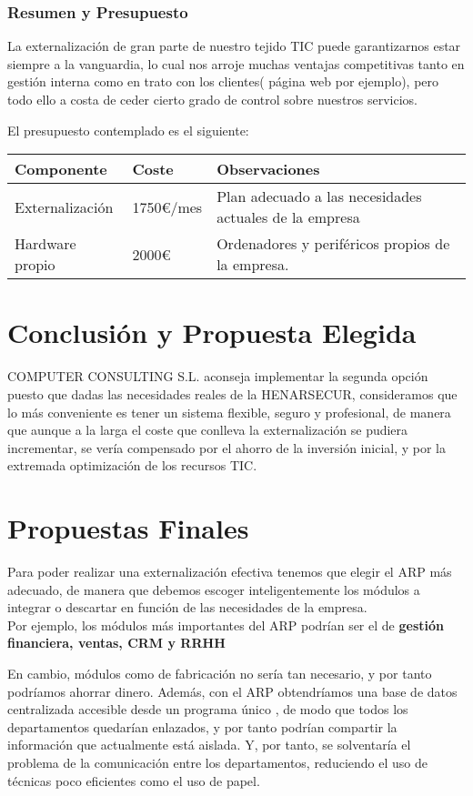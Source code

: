 \documentclass[12pt,letterpaper]{article}
\begin{document}
			\subsubsection{Resumen y Presupuesto}
	La externalización de gran parte de nuestro tejido TIC puede garantizarnos estar siempre a la vanguardia, lo cual nos arroje muchas ventajas competitivas tanto en gestión interna como en trato con los clientes( página web por ejemplo), pero todo ello a costa de ceder cierto grado de control sobre nuestros servicios.\par
	El presupuesto contemplado es el siguiente:
				\begin{center}
    				\begin{tabular}{ | l | l | p{7cm} |}
    				\hline
   					Componente & Coste & Observaciones \\ \hline
    				Externalización & 1750€/mes & Plan adecuado a las necesidades actuales de la empresa \\ \hline
    				Hardware propio & 2000€ & Ordenadores y periféricos propios de la empresa. \\ \hline
    				\end{tabular}
				\end{center}
	
	\section{Conclusión y Propuesta Elegida}
	COMPUTER CONSULTING S.L. aconseja implementar la segunda opción puesto que dadas las necesidades reales de la HENARSECUR, consideramos que lo más conveniente es tener un sistema flexible, seguro y profesional, de manera que aunque a la larga el coste que conlleva la externalización se pudiera incrementar, se vería compensado por el ahorro de la inversión inicial, y por la extremada optimización de los recursos TIC.


	\section{Propuestas Finales}
	Para poder realizar una externalización efectiva tenemos que elegir
	el ARP más adecuado, de manera que debemos escoger inteligentemente los
	módulos a integrar o descartar en función de las necesidades de la empresa.\\ Por ejemplo, los módulos más importantes del ARP podrían ser el de\textbf{ gestión financiera, ventas, CRM y RRHH}\par
	 En cambio, módulos como de fabricación no sería tan necesario, y por tanto podríamos ahorrar dinero.
	Además, con el ARP obtendríamos una base de datos centralizada accesible desde un programa único , de modo que todos los departamentos quedarían enlazados, y por tanto podrían compartir la información que actualmente está aislada. Y, por tanto, se solventaría el problema de la comunicación entre los departamentos, reduciendo el uso de técnicas poco eficientes como el uso de papel.\\
	
\end{document}
